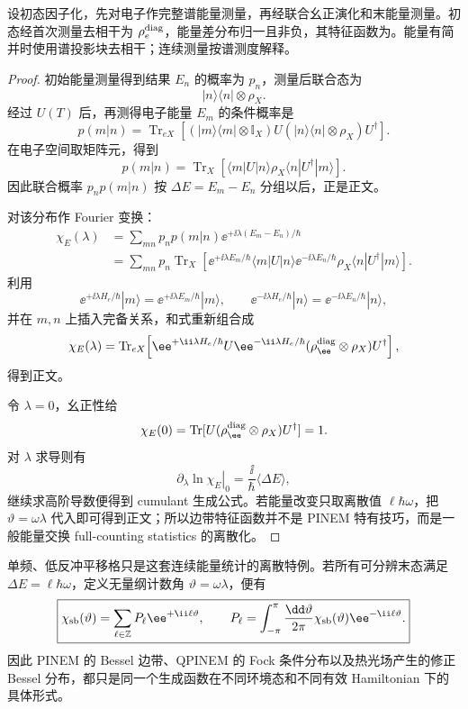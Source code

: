 \begin{proposition}[两次能量测量的特征函数]
设初态因子化，先对电子作完整谱能量测量，再经联合幺正演化和末能量测量。初态经首次测量去相干为 $\rho_e^{\rm diag}$，能量差分布归一且非负，其特征函数为。能量有简并时使用谱投影块去相干；连续测量按谱测度解释。
\end{proposition}
\begin{proof}
初始能量测量得到结果 $E_n$ 的概率为 $p_n$，测量后联合态为
\[
|n\rangle\langle n|\otimes\rho_X.
\]
经过 $U(T)$ 后，再测得电子能量 $E_m$ 的条件概率是
\[
p(m|n)
=\operatorname{Tr}_{eX}\!\left[
(|m\rangle\langle m|\otimes\mathbb I_X)
U(|n\rangle\langle n|\otimes\rho_X)U^\dagger
\right].
\]
在电子空间取矩阵元，得到
\[
p(m|n)
=\operatorname{Tr}_X\!\left[
\langle m|U|n\rangle\rho_X
\langle n|U^\dagger|m\rangle
\right].
\]
因此联合概率 $p_n p(m|n)$ 按
$\Delta E=E_m-E_n$ 分组以后，正是正文。

对该分布作 Fourier 变换：
\begin{align*}
\chi_E(\lambda)
&=\sum_{mn}p_n p(m|n)
\ee^{+\ii\lambda(E_m-E_n)/\hbar}\\
&=\sum_{mn}p_n
\operatorname{Tr}_X\!\left[
\ee^{+\ii\lambda E_m/\hbar}
\langle m|U|n\rangle
\ee^{-\ii\lambda E_n/\hbar}
\rho_X
\langle n|U^\dagger|m\rangle
\right].
\end{align*}
利用
\[
\ee^{+\ii\lambda H_e/\hbar}|m\rangle
=\ee^{+\ii\lambda E_m/\hbar}|m\rangle,
\qquad
\ee^{-\ii\lambda H_e/\hbar}|n\rangle
=\ee^{-\ii\lambda E_n/\hbar}|n\rangle,
\]
并在 $m,n$ 上插入完备关系，和式重新组合成
\[
\chi_E(\lambda)
=\operatorname{Tr}_{eX}\!\left[
\ee^{+\ii\lambda H_e/\hbar}
U
\ee^{-\ii\lambda H_e/\hbar}
(\rho_\ee^{\rm diag}\otimes\rho_X)
U^\dagger
\right],
\]
得到正文。

令 $\lambda=0$，幺正性给
\[
\chi_E(0)
=\operatorname{Tr}[U(\rho_\ee^{\rm diag}\otimes\rho_X)U^\dagger]=1.
\]
对 $\lambda$ 求导则有
\[
\left.\partial_\lambda\ln\chi_E\right|_0
=\frac{\ii}{\hbar}\langle\Delta E\rangle,
\]
继续求高阶导数便得到 cumulant 生成公式。若能量改变只取离散值
$\ell\hbar\omega$，把 $\vartheta=\omega\lambda$ 代入即可得到正文；所以边带特征函数并不是 PINEM 特有技巧，而是一般能量交换 full-counting statistics 的离散化。
\end{proof}


单频、低反冲平移格只是这套连续能量统计的离散特例。若所有可分辨末态满足
$\Delta E=\ell\hbar\omega$，定义无量纲计数角 $\vartheta=\omega\lambda$，便有
\begin{equation}
\boxed{
\chi_{\rm sb}(\vartheta)
=\sum_{\ell\in\mathbb Z}P_\ell\ee^{+\ii\ell\vartheta},
\qquad
P_\ell
=\int_{-\pi}^{\pi}\frac{\dd\vartheta}{2\pi}
\chi_{\rm sb}(\vartheta)\ee^{-\ii\ell\vartheta}.}
\label{eq:sideband_full_counting_characteristic}
\end{equation}
因此 PINEM 的 Bessel 边带、QPINEM 的 Fock 条件分布以及热光场产生的修正 Bessel 分布，都只是同一个生成函数在不同环境态和不同有效 Hamiltonian 下的具体形式。

